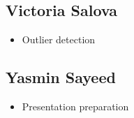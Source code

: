 \documentclass[letterpaper, 12 pt, conference]{ieeeconf}  %
\begin{document}
\subsection*{Victoria Salova}
        \begin{itemize}
                \item Outlier detection
        \end{itemize}

\subsection*{Yasmin Sayeed}
        \begin{itemize}
                \item Presentation preparation
        \end{itemize}
\end{document}
